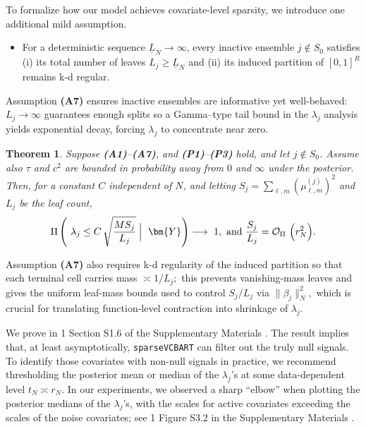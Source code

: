 \documentclass[11pt]{article}
\theoremstyle{plain}
\newtheorem{theorem}{Theorem}
\theoremstyle{definition}
\theoremstyle{plain}
\newcommand{\includesupp}{1}
\newcommand{\switchref}[2]{%
  \if\includesupp1%
    #1%
  \else%
    #2%
  \fi%
}
\begin{document}
To formalize how our model achieves covariate-level sparsity, we introduce one additional mild assumption. 
\begin{itemize}
\item[\textbf{(A7)}] For a deterministic sequence $\underline{L}_N \rightarrow \infty$, every inactive ensemble \(j\notin S_0\) satisfies (i) its total number of leaves \(L_j \ge \underline{L}_N\) and (ii) its induced partition of $[0,1]^R$ remains k-d regular.
\end{itemize}
Assumption \textbf{(A7)} ensures inactive ensembles are informative yet well-behaved: $L_j \rightarrow \infty$ guarantees enough splits so a Gamma–type tail bound in the $\lambda_j$ analysis yields exponential decay, forcing $\lambda_j$ to concentrate near zero.

\begin{theorem}\label{thm:lambda-shrink}
Suppose \textbf{(A1)}–\textbf{(A7)}, and \textbf{(P1)}–\textbf{(P3)} hold, and let \(j\notin S_0\).  Assume also \(\tau\) and \(c^2\) are bounded in probability away from \(0\) and \(\infty\) under the posterior.  Then, for a constant \(C\) independent of \(N\), and letting \(S_j=\sum_{\ell,m}(\mu^{(j)}_{\ell,m})^2\) and \(L_j\) be the leaf count,
\[
\Pi\left(\ \lambda_j \le C\,\sqrt{\frac{MS_j}{L_j}} \Bigm|\ \bm{Y}\right) \longrightarrow\ 1, \
\text{and} \
\frac{S_j}{L_j} = \mathcal O_{\Pi} \ \Big(r_N ^2\Big).
\]
\end{theorem}
Assumption \textbf{(A7)} also requires k-d regularity of the induced partition so that each terminal cell carries mass $\asymp 1/L_j;$ this prevents vanishing-mass leaves and gives the uniform leaf-mass bounds used to control $S_j/L_j$ via $\|\beta_j\|_N ^2,$ which is crucial for translating function-level contraction into shrinkage of $\lambda_j$.

We prove \Cref{thm:lambda-shrink} in \switchref{\Cref{sec:proof_local_scale}}{Section S1.6 of the Supplementary Materials}.
The result implies that, at least asymptotically, \texttt{sparseVCBART} can filter out the truly null signals.
To identify those covariates with non-null signals in practice, we recommend thresholding the posterior mean or median of the $\lambda_{j}$'s at some data-dependent level $t_{N} \asymp r_{N}.$
In our experiments, we observed a sharp ``elbow'' when plotting the posterior medians of the $\lambda_{j}$'s, with the scales for active covariates exceeding the scales of the noise covariates; see \switchref{}{Figure S3.2 in the Supplementary Materials}.
\end{document}
